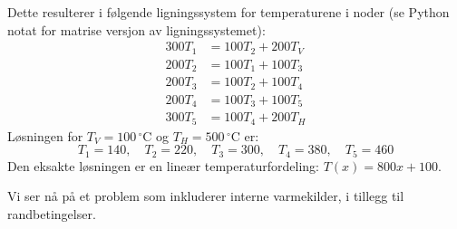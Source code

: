 Dette resulterer i følgende ligningssystem for temperaturene i noder (se Python notat for matrise versjon av ligningssystemet):
\[
\begin{aligned}
300 T_1 &= 100 T_2 + 200 T_V \\
200 T_2 &= 100 T_1 + 100 T_3 \\
200 T_3 &= 100 T_2 + 100 T_4 \\
200 T_4 &= 100 T_3 + 100 T_5 \\
300 T_5 &= 100 T_4 + 200 T_H
\end{aligned}
\]
Løsningen for $T_V = 100\,^\circ$C og $T_H = 500\,^\circ$C er:
\[
T_1 = 140, \quad T_2 = 220, \quad T_3 = 300, \quad T_4 = 380, \quad T_5 = 460
\]
Den eksakte løsningen er en lineær temperaturfordeling: $T(x) = 800x + 100$. 


Vi ser nå på et problem som inkluderer interne varmekilder, i tillegg til randbetingelser.

